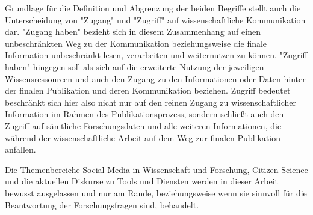 Grundlage für die Definition und Abgrenzung der beiden Begriffe stellt auch die Unterscheidung von "Zugang" und "Zugriff" auf wissenschaftliche Kommunikation dar. "Zugang haben" bezieht sich in diesem Zusammenhang auf einen unbeschränkten Weg zu der Kommunikation beziehungsweise die finale Information unbeschränkt lesen\cite{cite:9a}, verarbeiten und weiternutzen zu können. "Zugriff haben" hingegen soll als sich auf die erweiterte Nutzung der jeweiligen Wissensressourcen und auch den Zugang zu den Informationen oder Daten hinter der finalen Publikation und deren Kommunikation beziehen\cite{cite:9b}. Zugriff bedeutet beschränkt sich hier also nicht nur auf den reinen Zugang zu wissenschaftlicher Information im Rahmen des Publikationsprozess, sondern schließt auch den Zugriff auf sämtliche Forschungsdaten und alle weiteren Informationen, die während der wissenschaftliche Arbeit auf dem Weg zur finalen Publikation anfallen\cite{cite:9c}.

Die Themenbereiche Social Media in Wissenschaft und Forschung, Citizen Science und die aktuellen Diskurse zu Tools und Diensten werden in dieser Arbeit bewusst ausgelassen und nur am Rande, beziehungsweise wenn sie sinnvoll für die Beantwortung der Forschungsfragen sind, behandelt.